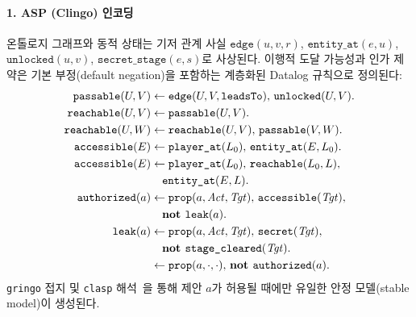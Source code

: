 \paragraph{1. ASP (Clingo) 인코딩}
온톨로지 그래프와 동적 상태는 기저 관계 사실 $\texttt{edge}(u, v, r)$, $\texttt{entity\_at}(e, u)$, $\texttt{unlocked}(u, v)$, $\texttt{secret\_stage}(e, s)$로 사상된다. 이행적 도달 가능성과 인가 제약은 기본 부정(default negation)을 포함하는 계층화된 Datalog 규칙으로 정의된다:
{\footnotesize
\begin{align}
\texttt{passable}(U, V) &\leftarrow \texttt{edge}(U, V, \texttt{leadsTo}),\, \texttt{unlocked}(U, V). \label{eq:asp-passable} \\
\texttt{reachable}(U, V) &\leftarrow \texttt{passable}(U, V). \label{eq:asp-base} \\
\texttt{reachable}(U, W) &\leftarrow \texttt{reachable}(U, V),\, \texttt{passable}(V, W). \label{eq:asp-trans} \\
\texttt{accessible}(E) &\leftarrow \texttt{player\_at}(L_0),\, \texttt{entity\_at}(E, L_0). \label{eq:asp-local} \\
\texttt{accessible}(E) &\leftarrow \texttt{player\_at}(L_0),\, \texttt{reachable}(L_0, L),\notag\\
&\quad \texttt{entity\_at}(E, L). \label{eq:asp-remote} \\
\texttt{authorized}(a) &\leftarrow \texttt{prop}(a, \mathit{Act}, \mathit{Tgt}),\, \texttt{accessible}(\mathit{Tgt}),\notag\\
&\quad \textbf{not } \texttt{leak}(a). \label{eq:asp-auth} \\
\texttt{leak}(a) &\leftarrow \texttt{prop}(a, \mathit{Act}, \mathit{Tgt}),\, \texttt{secret}(\mathit{Tgt}),\notag\\
&\quad \textbf{not } \texttt{stage\_cleared}(\mathit{Tgt}). \label{eq:asp-leak} \\
&\leftarrow \texttt{prop}(a, \cdot, \cdot),\, \textbf{not } \texttt{authorized}(a). \label{eq:asp-integrity}
\end{align}}
\texttt{gringo} 접지 및 \texttt{clasp} 해석~\cite{gebser2019clingo}을 통해 제안 $a$가 허용될 때에만 유일한 안정 모델(stable model)이 생성된다.

